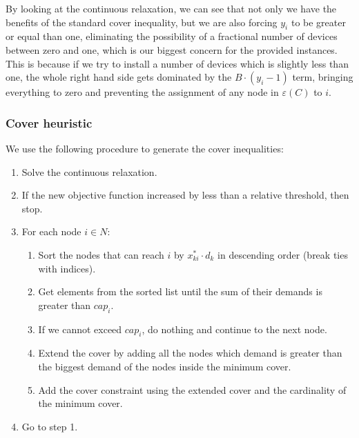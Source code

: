 By looking at the continuous relaxation, we can see that not only we have the benefits of the standard cover inequality, but we are also forcing $y_i$ to be greater or equal than one, eliminating the possibility of a fractional number of devices between zero and one, which is our biggest concern for the provided instances. This is because if we try to install a number of devices which is slightly less than one, the whole right hand side gets dominated by the $B \cdot (y_i - 1)$ term, bringing everything to zero and preventing the assignment of any node in $\varepsilon(C)$ to $i$.

\newpage
\subsubsection*{Cover heuristic}

We use the following procedure to generate the cover inequalities:
\begin{enumerate}
	\item Solve the continuous relaxation.
	\item If the new objective function increased by less than a relative threshold, then stop.
	\item For each node $i \in N$:
	\begin{enumerate}[label*=\arabic*.]
		\item Sort the nodes that can reach $i$ by $x^*_{ki} \cdot d_k$ in descending order (break ties with indices).
		\item Get elements from the sorted list until the sum of their demands is greater than $cap_i$.
		\item If we cannot exceed $cap_i$, do nothing and continue to the next node.
		\item Extend the cover by adding all the nodes which demand is greater than the biggest demand of the nodes inside the minimum cover.
		\item Add the cover constraint using the extended cover and the cardinality of the minimum cover.
	\end{enumerate}
	\item Go to step 1.
\end{enumerate}
